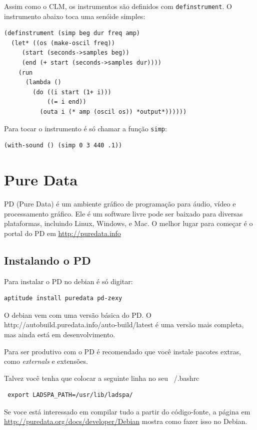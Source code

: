 \documentclass[12pt,brazil]{book}
\begin{document}
Assim como o CLM, os instrumentos são definidos com
\texttt{definstrument}. O instrumento abaixo toca uma senóide simples:

\begin{verbatim}
(definstrument (simp beg dur freq amp)
  (let* ((os (make-oscil freq))
	 (start (seconds->samples beg))
	 (end (+ start (seconds->samples dur))))
    (run
      (lambda ()
        (do ((i start (1+ i))) 
            ((= i end))
          (outa i (* amp (oscil os)) *output*))))))
\end{verbatim}

Para tocar o instrumento é só chamar a função \texttt{simp}:

\begin{verbatim}
(with-sound () (simp 0 3 440 .1))
\end{verbatim}

\chapter{Pure Data}
\label{cha:pure-data}

PD (Pure Data) é um ambiente gráfico de programação para áudio, vídeo
e processamento gráfico. Ele é um software livre pode ser baixado para
diversas plataformas, incluindo Linux, Windows, e Mac. O melhor lugar
para começar é o portal do PD em \url{http://puredata.info}

\section{Instalando o PD}

Para instalar o PD no debian é só digitar:

\begin{verbatim}
aptitude install puredata pd-zexy
\end{verbatim}

O debian vem com uma versão básica do PD. O
{http://autobuild.puredata.info/auto-build/latest} é uma versão mais
completa, mas ainda está em desenvolvimento.

Para ser produtivo com o PD é recomendado que você instale pacotes
extras, como \textit{externals} e extensões.

Talvez você tenha que colocar a seguinte linha no seu ~/.bashrc

\begin{verbatim}
 export LADSPA_PATH=/usr/lib/ladspa/
\end{verbatim}

Se voce está interessado em compilar tudo a partir do código-fonte, a
página em \url{http://puredata.org/docs/developer/Debian} mostra como
fazer isso no Debian.
\end{document}

